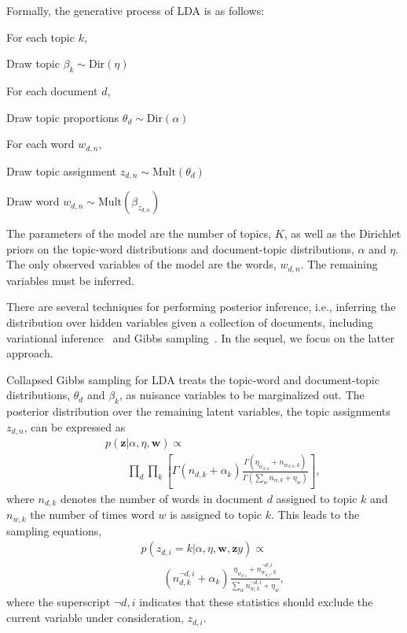 Formally, the generative process of LDA is as follows:
\begin{enumerate*}
  \item For each topic $k$, 
    \begin{enumerate*}
    \item Draw topic $\beta_k \sim \mathrm{Dir}(\eta)$
    \end{enumerate*}
  \item For each document $d$, 
    \begin{enumerate*}
    \item Draw topic proportions $\theta_d \sim \mathrm{Dir}(\alpha)$
    \item For each word $w_{d, n}$, 
      \begin{enumerate*}
      \item Draw topic assignment $z_{d,n} \sim \mathrm{Mult}(\theta_d)$
      \item Draw word $w_{d,n} \sim \mathrm{Mult}(\beta_{z_{d,n}})$
      \end{enumerate*}
    \end{enumerate*}
\end{enumerate*}
The parameters of the model are the number of topics, $K$, as well as
the Dirichlet priors on the topic-word distributions and
document-topic distributions, $\alpha$ and $\eta$.  The only observed
variables of the model are the words, $w_{d,n}$.  The remaining
variables must be inferred.

There are several techniques for performing posterior inference,
i.e., inferring the distribution over hidden variables given a
collection of documents, including variational
inference~\cite{blei-03} and Gibbs sampling~\cite{griffiths-06}.  In
the sequel, we focus on the latter approach.  

Collapsed Gibbs sampling for LDA treats the topic-word and
document-topic distributions, $\theta_d$ and $\beta_k$, as nuisance
variables to be marginalized out. The posterior distribution over the
remaining latent variables, the topic assignments $z_{d,n}$, can be
expressed as
\begin{eqnarray*}
  &&p(\bm{z} | \alpha, \eta, \bm{w}) \propto \\
  &&\qquad \prod_{d}\prod_{k} \left[ \Gamma(n_{d,k} + \alpha_{k})\frac{\Gamma(\eta_{w_{d,n}} + n_{w_{d,n}, k})}{\Gamma(\sum_w n_{w, k} + \eta_w)}\right],
\end{eqnarray*}
where $n_{d,k}$ denotes the number of words in document $d$ assigned
to topic $k$ and $n_{w,k}$ the number of times word $w$ is assigned to
topic $k$.  This leads to the sampling equations,
\begin{eqnarray}
  &&p(z_{d,i} = k | \alpha, \eta, \bm{w}, \bm{z}y) \propto \\
  &&\qquad (n^{\lnot d,i}_{d,k} + \alpha_{k})\frac{\eta_{w_{d,i}} + n^{\lnot d,i}_{w_{d,i}, k}}{\sum_w n^{\lnot d,i}_{w, k} + \eta_w},
  \label{eq:sampling}
\end{eqnarray}
where the superscript $\lnot d,i$ indicates that these statistics
should exclude the current variable under consideration, $z_{d,i}$.

